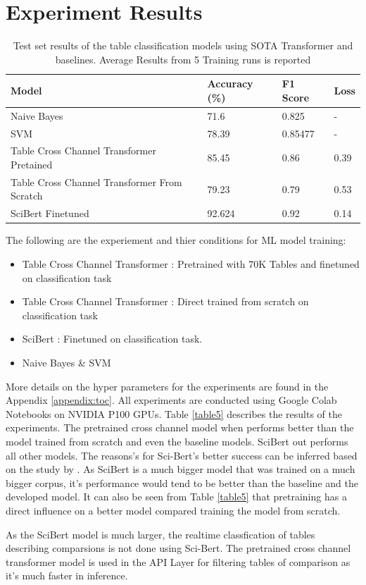 \section{Experiment Results}
\label{table_classification:experiement-result}
\begin{table}[h]
    \label{table\arabic{tablecounter}}
    \centering
    \begin{tabular}{|l|l|l|l|}
    \hline
        \textbf{Model} & \textbf{Accuracy} (\%) & \textbf{F1 Score}  & \textbf{Loss} \\ \hline
        Naive Bayes & 71.6 & 0.825 & - \\ \hline
        SVM  & 78.39 & 0.85477 & - \\ \hline
        Table Cross Channel Transformer Pretained & 85.45 & 0.86 & 0.39 \\ \hline
        Table Cross Channel Transformer From Scratch & 79.23 & 0.79 & 0.53 \\ \hline
        SciBert Finetuned & 92.624 & 0.92 & 0.14 \\ \hline
    \end{tabular}
    \caption{\label{tablecounter} Test set results of the table classification models using SOTA Transformer and baselines. Average Results from 5 Training runs is reported}
\end{table}
The following are the experiement and thier conditions for ML model training:
\begin{itemize}
    \item Table Cross Channel Transformer : Pretrained with 70K Tables and finetuned on classification task
    \item Table Cross Channel Transformer : Direct trained from scratch on classification task 
    \item SciBert : Finetuned on classification task.
    \item Naive Bayes \& SVM
\end{itemize}
More details on the hyper parameters for the experiments are found in the Appendix \ref{appendix:toc}.
All experiments are conducted using Google Colab Notebooks on NVIDIA P100 GPUs. Table \ref{table5} describes the results of the experiments. The pretrained cross channel model when performs better than the model trained from scratch and even the baseline models. SciBert out performs all other models. The reasons's for Sci-Bert's better success can be inferred based on the study by \cite{hernandez2021scaling}. As SciBert is a much bigger model that was trained on a much bigger corpus, it's performance would tend to be better than the baseline and the developed model. It can also be seen from Table \ref{table5} that pretraining has a direct influence on a better model compared training the model from scratch. 


As the SciBert model is much larger, the realtime classfication of tables describing comparsions is not done using Sci-Bert. The pretrained cross channel transformer model is used in the API Layer for filtering tables of comparison as it's much faster in inference. 
